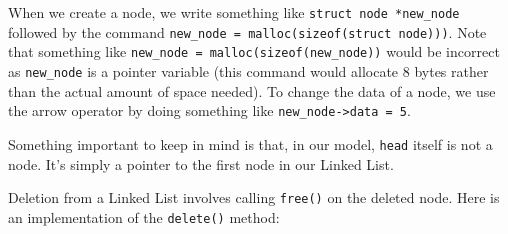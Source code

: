 When we create a node, we write something like \verb!struct node *new_node! followed by the command \verb!new_node = malloc(sizeof(struct node)))!. Note that something like \verb!new_node = malloc(sizeof(new_node))! would be incorrect as \verb!new_node! is a pointer variable (this command would allocate $8$ bytes rather than the actual amount of space needed). To change the data of a node, we use the arrow operator by doing something like \verb!new_node->data = 5!. 


Something important to keep in mind is that, in our model, \verb!head! itself is not a node. It's simply a pointer to the first node in our Linked List.


Deletion from a Linked List involves calling \verb!free()! on the deleted node. Here is an implementation of the \verb!delete()! method:


\lstset{
caption=Linked List Deletion}
\begin{center}
\label{Linked List Deletion}
\end{center}



